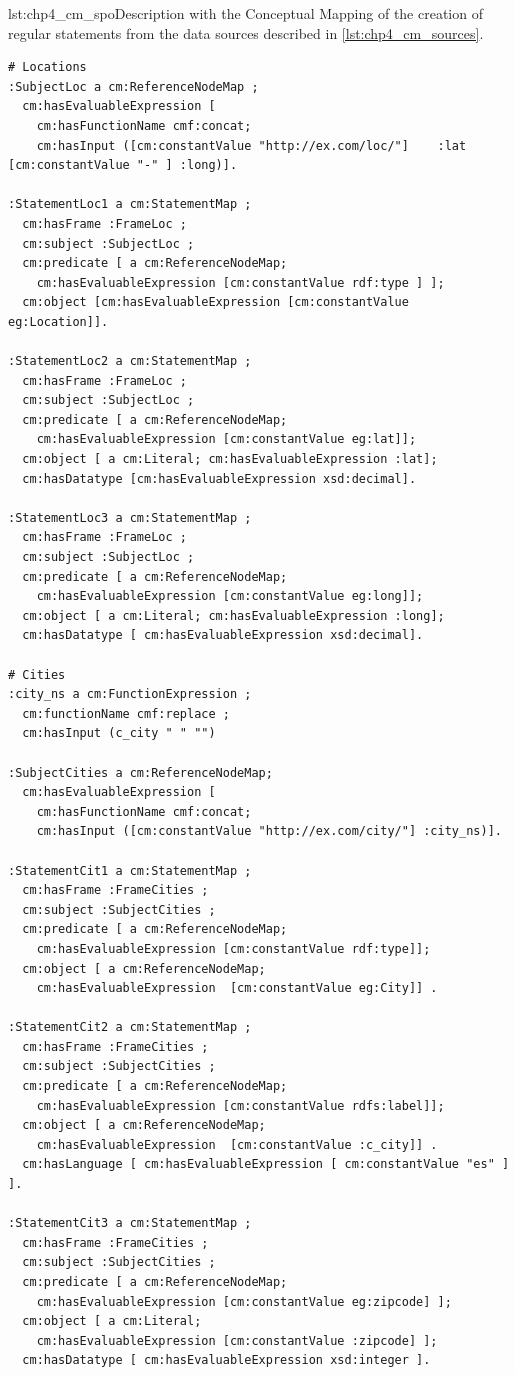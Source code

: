 \begin{captionedlisting}{lst:chp4_cm_spo}{Description with the Conceptual Mapping of the creation of regular statements from the data sources described in \cref{lst:chp4_cm_sources}.}
\centering
{\begin{lstlisting}[language=concm,firstnumber=1]
# Locations
:SubjectLoc a cm:ReferenceNodeMap ;
  cm:hasEvaluableExpression [
    cm:hasFunctionName cmf:concat; 
    cm:hasInput ([cm:constantValue "http://ex.com/loc/"]    :lat [cm:constantValue "-" ] :long)].

:StatementLoc1 a cm:StatementMap ;
  cm:hasFrame :FrameLoc ;
  cm:subject :SubjectLoc ;
  cm:predicate [ a cm:ReferenceNodeMap; 
    cm:hasEvaluableExpression [cm:constantValue rdf:type ] ];
  cm:object [cm:hasEvaluableExpression [cm:constantValue eg:Location]].

:StatementLoc2 a cm:StatementMap ;
  cm:hasFrame :FrameLoc ;
  cm:subject :SubjectLoc ;
  cm:predicate [ a cm:ReferenceNodeMap; 
    cm:hasEvaluableExpression [cm:constantValue eg:lat]];
  cm:object [ a cm:Literal; cm:hasEvaluableExpression :lat];
  cm:hasDatatype [cm:hasEvaluableExpression xsd:decimal].

:StatementLoc3 a cm:StatementMap ;
  cm:hasFrame :FrameLoc ;
  cm:subject :SubjectLoc ;
  cm:predicate [ a cm:ReferenceNodeMap; 
    cm:hasEvaluableExpression [cm:constantValue eg:long]];
  cm:object [ a cm:Literal; cm:hasEvaluableExpression :long];
  cm:hasDatatype [ cm:hasEvaluableExpression xsd:decimal].
    
# Cities
:city_ns a cm:FunctionExpression ;
  cm:functionName cmf:replace ;
  cm:hasInput (c_city " " "")

:SubjectCities a cm:ReferenceNodeMap;
  cm:hasEvaluableExpression [
    cm:hasFunctionName cmf:concat; 
    cm:hasInput ([cm:constantValue "http://ex.com/city/"] :city_ns)].

:StatementCit1 a cm:StatementMap ;
  cm:hasFrame :FrameCities ;
  cm:subject :SubjectCities ;
  cm:predicate [ a cm:ReferenceNodeMap; 
    cm:hasEvaluableExpression [cm:constantValue rdf:type]];
  cm:object [ a cm:ReferenceNodeMap; 
    cm:hasEvaluableExpression  [cm:constantValue eg:City]] .

:StatementCit2 a cm:StatementMap ;
  cm:hasFrame :FrameCities ;
  cm:subject :SubjectCities ;
  cm:predicate [ a cm:ReferenceNodeMap; 
    cm:hasEvaluableExpression [cm:constantValue rdfs:label]];
  cm:object [ a cm:ReferenceNodeMap; 
    cm:hasEvaluableExpression  [cm:constantValue :c_city]] .
  cm:hasLanguage [ cm:hasEvaluableExpression [ cm:constantValue "es" ] ].

:StatementCit3 a cm:StatementMap ;
  cm:hasFrame :FrameCities ;
  cm:subject :SubjectCities ;
  cm:predicate [ a cm:ReferenceNodeMap; 
    cm:hasEvaluableExpression [cm:constantValue eg:zipcode] ];
  cm:object [ a cm:Literal;
    cm:hasEvaluableExpression [cm:constantValue :zipcode] ];
  cm:hasDatatype [ cm:hasEvaluableExpression xsd:integer ].
\end{lstlisting}}
\end{captionedlisting}


